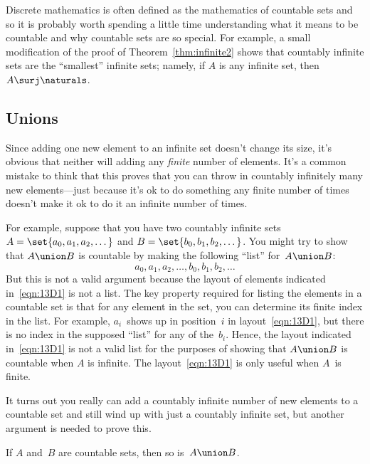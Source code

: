 Discrete mathematics is often defined as the mathematics of countable
sets and so it is probably worth spending a little time understanding
what it means to be countable and why countable sets are so special.
For example, a small modification
of the proof of Theorem~\ref{thm:infinite2} shows that countably
infinite sets are the ``smallest'' infinite sets; namely, if $A$ is
any infinite set, then $A \surj \naturals$.

\subsection{Unions}

Since adding one new element to an infinite set doesn't change its
size, it's obvious that neither will adding any \emph{finite} number
of elements.  It's a common mistake to think that this proves that you
can throw in countably infinitely many new elements---just because
it's ok to do something any finite number of times doesn't make it ok
to do it an infinite number of times.

For example, suppose that you have two countably infinite sets $A =
\set{a_0, a_1, a_2, \dots}$ and $B = \set{b_0, b_1, b_2, \dots}$.  You
might try to show that $A \union B$ is countable by making the
following ``list'' for~$A \union B$:
\begin{equation}\label{eqn:13D1}
    a_0, a_1, a_2, \dots, b_0, b_1, b_2, \dots
\end{equation}
But this is not a valid argument because the layout of elements
indicated in~\ref{eqn:13D1} is not a list.  The key property required
for listing the elements in a countable set is that for any element in
the set, you can determine its finite index in the list.  For example,
$a_i$~shows up in position~$i$ in layout~\ref{eqn:13D1}, but there is
no index in the supposed ``list'' for any of the~$b_i$.  Hence, the
layout indicated in~\ref{eqn:13D1} is not a valid list for the
purposes of showing that $A \union B$ is countable when $A$ is
infinite.  The layout~\ref{eqn:13D1} is only useful when $A$~is
finite.

It turns out you really can add a countably infinite number of new
elements to a countable set and still wind up with just a countably
infinite set, but another argument is needed to prove this.

\begin{theorem}\label{thm:countable_union}
If $A$ and~$B$ are countable sets, then so is~$A \union B$.
\end{theorem}

